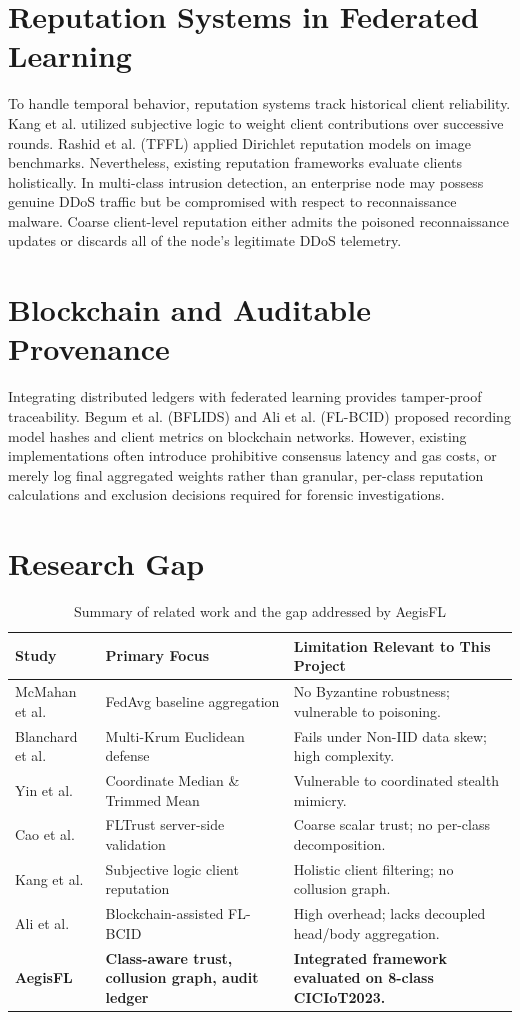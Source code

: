 \documentclass[12pt,a4paper]{report}
\begin{document}
\section{Reputation Systems in Federated Learning}
To handle temporal behavior, reputation systems track historical client reliability. Kang et al. utilized subjective logic to weight client contributions over successive rounds. Rashid et al. (TFFL) applied Dirichlet reputation models on image benchmarks. Nevertheless, existing reputation frameworks evaluate clients holistically. In multi-class intrusion detection, an enterprise node may possess genuine DDoS traffic but be compromised with respect to reconnaissance malware. Coarse client-level reputation either admits the poisoned reconnaissance updates or discards all of the node's legitimate DDoS telemetry.

\section{Blockchain and Auditable Provenance}
Integrating distributed ledgers with federated learning provides tamper-proof traceability. Begum et al. (BFLIDS) and Ali et al. (FL-BCID) proposed recording model hashes and client metrics on blockchain networks. However, existing implementations often introduce prohibitive consensus latency and gas costs, or merely log final aggregated weights rather than granular, per-class reputation calculations and exclusion decisions required for forensic investigations.

\section{Research Gap}
\begin{table}[H]
\centering
\small
\caption{Summary of related work and the gap addressed by AegisFL}
\label{tab:lit_survey}
\begin{tabularx}{\textwidth}{lXX}
\toprule
\textbf{Study} & \textbf{Primary Focus} & \textbf{Limitation Relevant to This Project} \\
\midrule
McMahan et al. & FedAvg baseline aggregation & No Byzantine robustness; vulnerable to poisoning. \\
Blanchard et al. & Multi-Krum Euclidean defense & Fails under Non-IID data skew; high complexity. \\
Yin et al. & Coordinate Median \& Trimmed Mean & Vulnerable to coordinated stealth mimicry. \\
Cao et al. & FLTrust server-side validation & Coarse scalar trust; no per-class decomposition. \\
Kang et al. & Subjective logic client reputation & Holistic client filtering; no collusion graph. \\
Ali et al. & Blockchain-assisted FL-BCID & High overhead; lacks decoupled head/body aggregation. \\
\textbf{AegisFL} & \textbf{Class-aware trust, collusion graph, audit ledger} & \textbf{Integrated framework evaluated on 8-class CICIoT2023.} \\
\bottomrule
\end{tabularx}
\end{table}
\end{document}
